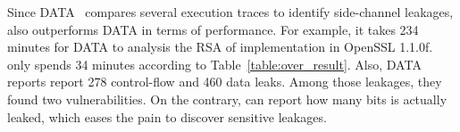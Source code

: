 Since DATA~\cite{217537} compares several execution traces to identify
side-channel leakages, \tool{} also outperforms DATA in terms of performance.
For example, it takes 234 minutes for DATA to analysis the RSA of implementation
in OpenSSL 1.1.0f. \tool{} only spends 34 minutes according to Table~\ref{table:over_result}.
Also, DATA reports report 278 control-flow and 460 data leaks. Among those leakages,
they found two vulnerabilities. On the contrary, \tool{} can report how many bits is
actually leaked, which eases the pain to discover sensitive leakages.

\begin{table}[]
    \caption{Comparison with CacheD}
    \label{eval:cacheD}
\end{table}

